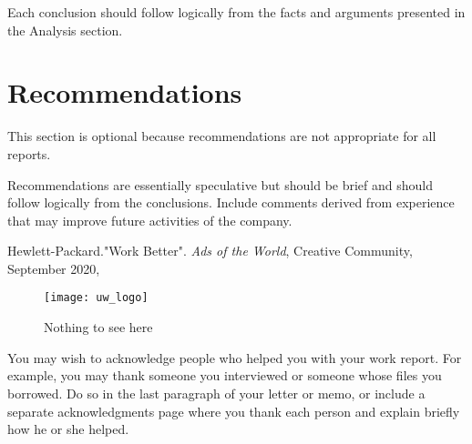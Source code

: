 \documentclass[12pt]{article}
\begin{document}
Each conclusion should follow logically from the facts and arguments presented in the Analysis section.

\newpage
\section{Recommendations}


This section is optional because recommendations are not appropriate for all reports. 

Recommendations are essentially speculative but should be brief and should follow logically from the conclusions. Include comments derived from experience that may improve future activities of the company.




\begin{thebibliography}{1}
	Hewlett-Packard."Work Better". \textit{Ads of the World}, Creative Community, September 2020,
\end{thebibliography}




\begin{figure}[H]
	\texttt{[image: uw\_logo]}
	\centering
	\caption{Nothing to see here}
\end{figure}

You may wish to acknowledge people who helped you with your work report. For example, you may thank someone you interviewed or someone whose files you borrowed. Do so in the last paragraph of your letter or memo, or include a separate acknowledgments page where you thank each person and explain briefly how he or she helped.
\end{document}
